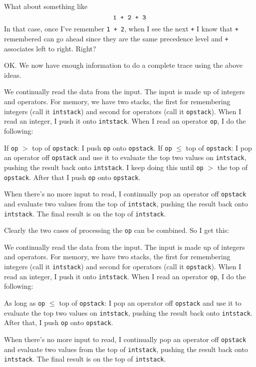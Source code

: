 What about something like 
\[
\text{\texttt{1 + 2 + 3}}
\]
In that case, once I've remember \texttt{1 + 2},
when I see the next \texttt{+} I know that \texttt{+} remembered
can go ahead since they are the same precedence level
and \texttt{+} associates left to right.
Right?

OK.
We now have enough information to do a complete
trace using the above ideas.
\begin{enumerate}[nosep]
  \li We continually read the data from the input. The input
  is made up of integers and operators.
  \li For memory, we have two stacks, the first
  for remembering
  integers (call it \texttt{intstack}) and second for operators
  (call it \texttt{opstack}).
  \li When I read an integer, I push it onto \texttt{intstack}.
  \li When I read an operator \texttt{op}, I do the following:
  \begin{enumerate}[nosep]
    \li If \texttt{op} $>$ top of \texttt{opstack}:
    I push \texttt{op} onto \texttt{opstack}.
    \li If \texttt{op} $\leq$ top of \texttt{opstack}:
    I pop an operator off \texttt{opstack} and use it to
    evaluate the top two values on \texttt{intstack}, pushing
    the result back onto \texttt{intstack}.
    I keep doing this until \texttt{op} $>$ the top of
    \texttt{opstack}.
    After that I push \texttt{op} onto \texttt{opstack}.
  \end{enumerate}
  \li When there's no more input to read, I continually
  pop an operator off \texttt{opstack} and evaluate
  two values from the top of \texttt{intstack}, pushing the
  result back onto \texttt{intstack}.
  The final result is on the top of \texttt{intstack}.
\end{enumerate}
Clearly the two cases of processing the \texttt{op} can be combined.
So I get this:
\begin{enumerate}[nosep]
  \li We continually read the data from the input. The input
  is made up of integers and operators.
  \li For memory, we have two stacks, the first
  for remembering
  integers (call it \texttt{intstack}) and second for operators
  (call it \texttt{opstack}).
  \li When I read an integer, I push it onto \texttt{intstack}.
  \li When I read an operator \texttt{op}, I do the following:
  \begin{enumerate}[nosep]
    \li As long as \texttt{op} $\leq$ top of \texttt{opstack}:
    I pop an operator off \texttt{opstack} and use it to
    evaluate the top two values on \texttt{intstack}, pushing
    the result back onto \texttt{intstack}.
    \li After that, I push \texttt{op} onto \texttt{opstack}.  
  \end{enumerate}
  \li When there's no more input to read, I continually
  pop an operator off \texttt{opstack} and evaluate
  two values from the top of \texttt{intstack}, pushing the
  result back onto \texttt{intstack}.
  The final result is on the top of \texttt{intstack}.
\end{enumerate}

